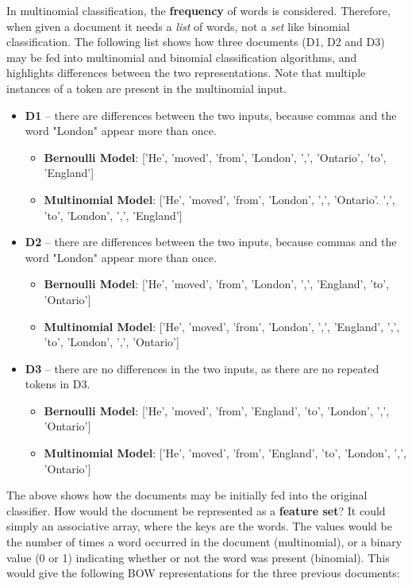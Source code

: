 \documentclass{article}
\begin{document}
In multinomial classification, the \textbf{frequency} of words is considered. Therefore, when given a document it needs a \textit{list} of words, not a \textit{set} like binomial classification. The following list shows how three documents (D1, D2 and D3) may be fed into multinomial and binomial classification algorithms, and highlights differences between the two representations. Note that multiple instances of a token are present in the multinomial input.
\begin{itemize}
	\item \textbf{D1} -- there are differences between the two inputs, because commas and the word "London" appear more than once. \begin{itemize}
		\item \textbf{Bernoulli Model}: ['He', 'moved', 'from', 'London', ',', 'Ontario', 'to', 'England']
		\item \textbf{Multinomial Model}: ['He', 'moved', 'from', 'London', ',', 'Ontario'. ',', 'to', 'London', ',', 'England']
		\end{itemize}
	\item \textbf{D2} -- there are differences between the two inputs, because commas and the word "London" appear more than once. \begin{itemize}
		\item \textbf{Bernoulli Model}: ['He', 'moved', 'from', 'London', ',', 'England', 'to', 'Ontario']
		\item \textbf{Multinomial Model}: ['He', 'moved', 'from', 'London', ',', 'England', ',', 'to', 'London', ',', 'Ontario']
	  \end{itemize}
	\item \textbf{D3} -- there are no differences in the two inputs, as there are no repeated tokens in D3.
	\begin{itemize}
	\item \textbf{Bernoulli Model}: ['He', 'moved', 'from', 'England', 'to', 'London', ',', 'Ontario']
	\item \textbf{Multinomial Model}: ['He', 'moved', 'from', 'England', 'to', 'London', ',', 'Ontario']
	\end{itemize}
\end{itemize}

The above shows how the documents may be initially fed into the original classifier. How would the document be represented as a \textbf{feature set}? It could simply an associative array, where the keys are the words. The values would be the number of times a word occurred in the document (multinomial), or a binary value (0 or 1) indicating whether or not the word was present (binomial). This would give the following BOW representations for the three previous documents:
\end{document}
